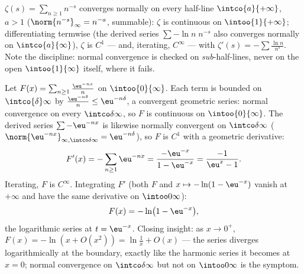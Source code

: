 \begin{example}\label{ex:b2:funcseq:zeta}
$\zeta(s) = \sum_{n\geq1} n^{-s}$ converges normally on every
half-line $\intco{a}{+\infty}$, $a > 1$ ($\norm{n^{-s}}_\infty =
n^{-a}$, summable): $\zeta$ is continuous on $\intoo{1}{+\infty}$;
differentiating termwise (the derived series $\sum -\ln n\; n^{-s}$
also converges normally on $\intco{a}{\infty}$), $\zeta$ is $C^1$
--- and, iterating, $C^\infty$ --- with $\zeta'(s) = -\sum \frac{\ln
n}{n^s}$. Note the discipline: normal convergence is checked on
\emph{sub}-half-lines, never on the open $\intoo{1}{\infty}$
itself, where it fails.
\end{example}

\begin{example}\label{ex:b2:funcseq:logseries}
Let $F(x) = \sum_{n\geq1} \frac{\eu^{-nx}}{n}$ on
$\intoo{0}{\infty}$. Each term is bounded on $\intco{\delta}
\infty$ by $\frac{\eu^{-n\delta}}{n} \leq \eu^{-n\delta}$, a
convergent geometric series: normal convergence on every
$\intco\delta\infty$, so $F$ is continuous on
$\intoo{0}{\infty}$. The derived series $\sum -\eu^{-nx}$ is
likewise normally convergent on $\intco\delta\infty$
($\norm{\eu^{-nx}}_{\infty,\intco\delta\infty} =
\eu^{-n\delta}$), so $F$ is $C^1$ with a geometric derivative:
\[
F'(x) = -\sum_{n\geq1}\eu^{-nx}
= \frac{-\eu^{-x}}{1 - \eu^{-x}}
= \frac{-1}{\eu^{x} - 1} .
\]
Iterating, $F$ is $C^\infty$. Integrating $F'$ (both $F$ and $x
\mapsto -\ln(1 - \eu^{-x})$ vanish at $+\infty$ and have the
same derivative on $\intoo0\infty$):
\[
F(x) = -\ln\bigl(1 - \eu^{-x}\bigr),
\]
the logarithmic series at $t = \eu^{-x}$. Closing insight: as $x
\to 0^+$, $F(x) = -\ln(x + O(x^2)) = \ln\frac1x + O(x)$ --- the
series diverges logarithmically at the boundary, exactly like
the harmonic series it becomes at $x = 0$; normal convergence on
$\intco\delta\infty$ but not on $\intoo0\infty$ is the
symptom.
\end{example}

